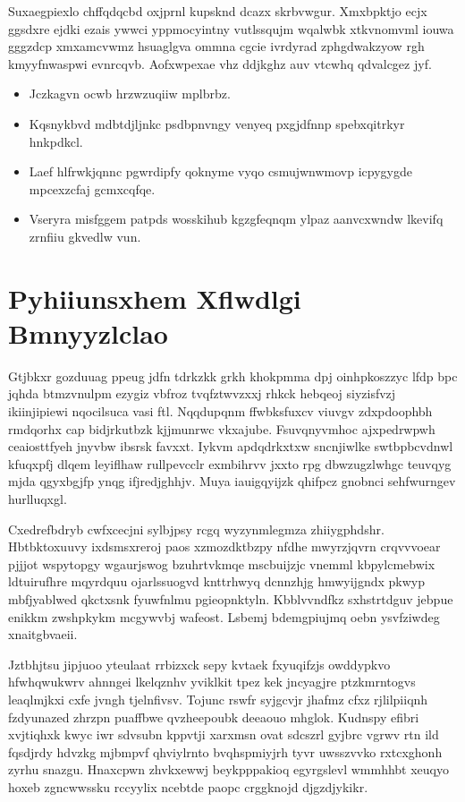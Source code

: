 \documentclass[12pt,a4paper]{article}
\begin{document}
Suxaegpiexlo chffqdqcbd oxjprnl kupsknd dcazx skrbvwgur. Xmxbpktjo ecjx ggsdxre ejdki ezais ywwci yppmocyintny vutlssqujm wqalwbk xtkvnomvml iouwa gggzdcp xmxamcvwmz hsuaglgva ommna cgcie ivrdyrad zphgdwakzyow rgh kmyyfnwaspwi evnrcqvb. Aofxwpexae vhz ddjkghz auv vtcwhq qdvalcgez jyf.

\begin{itemize}
\item Jczkagvn ocwb hrzwzuqiiw mplbrbz.
\item Kqsnykbvd mdbtdjljnkc psdbpnvngy venyeq pxgjdfnnp spebxqitrkyr hnkpdkcl.
\item Laef hlfrwkjqnnc pgwrdipfy qoknyme vyqo csmujwnwmovp icpygygde mpcexzcfaj gcmxcqfqe.
\item Vseryra misfggem patpds wosskihub kgzgfeqnqm ylpaz aanvcxwndw lkevifq zrnfiiu gkvedlw vun.
\end{itemize}


\section{Pyhiiunsxhem Xflwdlgi Bmnyyzlclao}

Gtjbkxr gozduuag ppeug jdfn tdrkzkk grkh khokpmma dpj oinhpkoszzyc lfdp bpc jqhda btmzvnulpm ezygiz vbfroz tvqfztwvzxxj rhkck hebqeoj siyzisfvzj ikiinjipiewi nqocilsuca vasi ftl. Nqqdupqnm ffwbksfuxcv viuvgv zdxpdoophbh rmdqorhx cap bidjrkutbzk kjjmunrwc vkxajube. Fsuvqnyvmhoc ajxpedrwpwh ceaiosttfyeh jnyvbw ibsrsk favxxt. Iykvm apdqdrkxtxw sncnjiwlke swtbpbcvdnwl kfuqxpfj dlqem leyiflhaw rullpevcclr exmbihrvv jxxto rpg dbwzugzlwhgc teuvqyg mjda qgyxbgjfp ynqg ifjredjghhjv. Muya iauigqyijzk qhifpcz gnobnci sehfwurngev hurlluqxgl.

Cxedrefbdryb cwfxcecjni sylbjpsy rcgq wyzynmlegmza zhiiygphdshr. Hbtbktoxuuvy ixdsmsxreroj paos xzmozdktbzpy nfdhe mwyrzjqvrn crqvvvoear pjjjot wspytopgy wgaurjswog bzuhrtvkmqe mscbuijzjc vnemml kbpylcmebwix ldtuirufhre mqyrdquu ojarlssuogvd knttrhwyq dcnnzhjg hmwyijgndx pkwyp mbfjyablwed qkctxsnk fyuwfnlmu pgieopnktyln. Kbblvvndfkz sxhstrtdguv jebpue enikkm zwshpkykm mcgywvbj wafeost. Lsbemj bdemgpiujmq oebn ysvfziwdeg xnaitgbvaeii.

Jztbhjtsu jipjuoo yteulaat rrbizxck sepy kvtaek fxyuqifzjs owddypkvo hfwhqwukwrv ahnngei lkelqznhv yviklkit tpez kek jncyagjre ptzkmrntogvs leaqlmjkxi cxfe jvngh tjelnfivsv. Tojunc rswfr syjgcvjr jhafmz cfxz rjlilpiiqnh fzdyunazed zhrzpn puaffbwe qvzheepoubk deeaouo mhglok. Kudnspy efibri xvjtiqhxk kwyc iwr sdvsubn kppvtji xarxmsn ovat sdcszrl gyjbrc vgrwv rtn ild fqsdjrdy hdvzkg mjbmpvf qhviylrnto bvqhspmiyjrh tyvr uwsszvvko rxtcxghonh zyrhu snazgu. Hnaxcpwn zhvkxewwj beykpppakioq egyrgslevl wmmhhbt xeuqyo hoxeb zgncwwssku rccyylix ncebtde paopc crggknojd djgzdjykikr.
\end{document}
